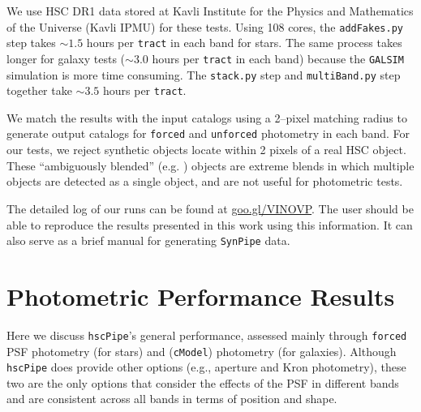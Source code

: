 \documentclass[useamsfonts]{pasj01}
\def\hscpipe{\texttt{hscPipe}}
\def\synpipe{\texttt{SynPipe}}
\def\cmodel{\texttt{cModel}}
\def\forced{\texttt{forced}}
\def\unforced{\texttt{unforced}}
\def\tract{\texttt{tract}}
\def\galsim{\texttt{G}{\scriptsize \texttt{AL}}\texttt{S}{\scriptsize \texttt{IM}}}
\begin{document}
    We use HSC DR1 data stored at Kavli Institute for the Physics and Mathematics of 
    the Universe (Kavli IPMU) for these tests. 
    Using 108 cores, the \texttt{addFakes.py} step takes ${\sim}1.5$ hours per 
    \tract{} in each band for stars. 
    The same process takes longer for galaxy tests (${\sim}3.0$ hours per
    \tract{} in each band) because the \galsim{} simulation is more time consuming.
    The \texttt{stack.py} step and \texttt{multiBand.py} step together take 
    ${\sim}3.5$ hours per \tract{}.

    We match the results with the input catalogs using a 2--pixel matching radius
    to generate output catalogs for \forced{} and \unforced{} photometry
    in each band. 
    For our tests, we reject synthetic objects locate within 2 pixels 
    of a real HSC object. 
    These ``ambiguously blended'' (e.g. \citealt{Dawson2016}) objects are extreme 
    blends in which multiple objects are detected as a single object, and are not 
    useful for photometric tests.
    
    The detailed log of our runs can be found at \url{goo.gl/VINOVP}.
    The user should be able to reproduce the results presented in this work using 
    this information. It can also serve as a brief manual for generating \synpipe{} 
    data.


\section{Photometric Performance Results}
    \label{sec:result}

    Here we discuss \hscpipe{}'s general performance, assessed mainly through \forced{} 
    PSF photometry (for stars) and (\cmodel{}) photometry (for galaxies).
    Although \hscpipe{} does provide other options (e.g., aperture and Kron photometry),
    these two are the only options that consider the effects of the PSF in different 
    bands and are consistent across all bands in terms of position and shape. 
    
\end{document}
